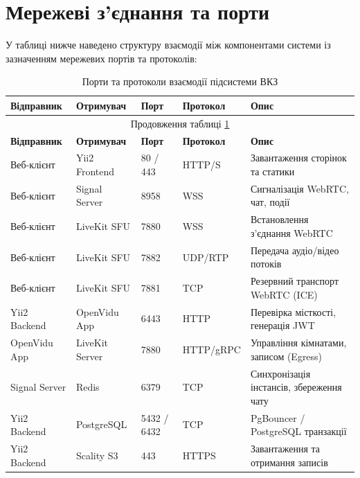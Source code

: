 \documentclass{article}
\begin{document}
\newpage

\section{Мережеві з'єднання та порти}
У таблиці нижче наведено структуру взаємодії між компонентами системи із зазначенням мережевих портів та протоколів:

\begin{longtable}{p{3cm}p{3cm}p{2cm}p{2cm}p{5cm}}
\caption{Порти та протоколи взаємодії підсистеми ВКЗ} \label{tab:ports} \\
\toprule
\textbf{Відправник} & \textbf{Отримувач} & \textbf{Порт} & \textbf{Протокол} & \textbf{Опис} \\
\midrule
\endfirsthead
\multicolumn{5}{c}{Продовження таблиці \ref{tab:ports}} \\
\toprule
\textbf{Відправник} & \textbf{Отримувач} & \textbf{Порт} & \textbf{Протокол} & \textbf{Опис} \\
\midrule
\endhead
\bottomrule
\endfoot
\bottomrule
\endlastfoot
Веб-клієнт    & Yii2 Frontend  & 80 / 443    & HTTP/S    & Завантаження сторінок та статики \\
Веб-клієнт    & Signal Server  & 8958        & WSS       & Сигналізація WebRTC, чат, події \\
Веб-клієнт    & LiveKit SFU    & 7880        & WSS       & Встановлення з'єднання WebRTC \\
Веб-клієнт    & LiveKit SFU    & 7882        & UDP/RTP   & Передача аудіо/відео потоків \\
Веб-клієнт    & LiveKit SFU    & 7881        & TCP       & Резервний транспорт WebRTC (ICE) \\
Yii2 Backend  & OpenVidu App   & 6443        & HTTP      & Перевірка місткості, генерація JWT \\
OpenVidu App  & LiveKit Server & 7880        & HTTP/gRPC & Управління кімнатами, записом (Egress) \\
Signal Server & Redis          & 6379        & TCP       & Синхронізація інстансів, збереження чату \\
Yii2 Backend  & PostgreSQL     & 5432 / 6432 & TCP       & PgBouncer / PostgreSQL транзакції \\
Yii2 Backend  & Scality S3     & 443         & HTTPS     & Завантаження та отримання записів \\
\end{longtable}
\end{document}
